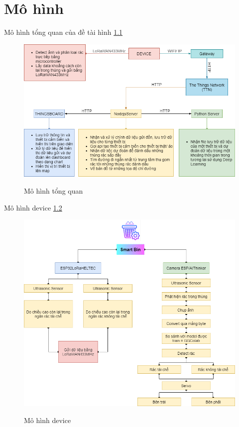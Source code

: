 

 







\chapter{ Mô hình}

Mô hình tổng quan của đề tài hình \ref{fig:general_chart}
\begin{figure}[h]
    \caption{Mô hình tổng quan }
    \includegraphics[width=\textwidth]{images/general_chart.png}
    \label{fig:general_chart}
\end{figure}

Mô hình device \ref{fig: chart_smartbin}
\begin{figure}[h]
    \caption{Mô hình device }
    \includegraphics[width=\textwidth]{images/Chart_smartbin.png}
    \label{fig: chart_smartbin}
\end{figure}

